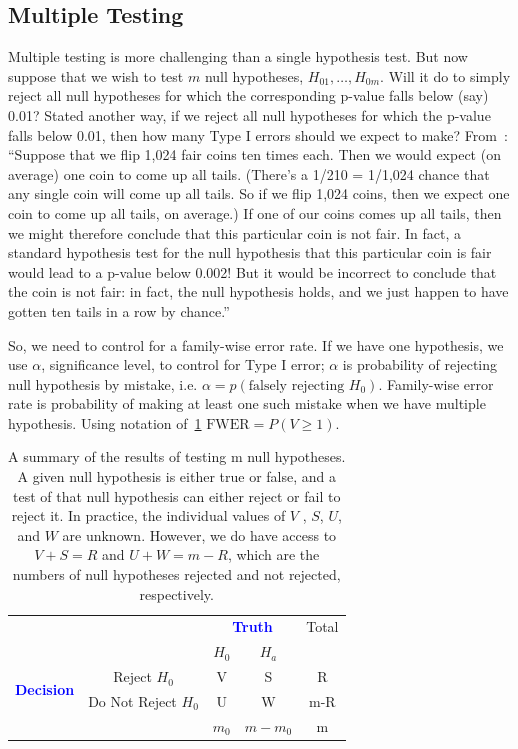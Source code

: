 \subsection{Multiple Testing}
\label{sec:Multiple-Testing}
Multiple testing is more challenging than a single hypothesis test.
But now suppose that we wish to test $m$ null hypotheses,
$H_{01}, \dots, H_{0m}$. 
Will it do to simply reject all null hypotheses for which the
corresponding p-value falls below (say) 0.01? Stated another way, if we
reject all null hypotheses for which the p-value falls below 0.01, then how
many Type I errors should we expect to make?
From~\citep{james2013introduction}:
``Suppose that we flip 1,024 fair
coins ten times each. Then we would expect (on average) one coin to
come up all tails. (There's a 1/210 = 1/1,024 chance that any single coin
will come up all tails. So if we flip 1,024 coins, then we expect one coin to
come up all tails, on average.) If one of our coins comes up all tails, then
we might therefore conclude that this particular coin is not fair. In fact, a
standard hypothesis test for the null hypothesis that this particular coin
is fair would lead to a p-value below 0.002! But it would be incorrect to
conclude that the coin is not fair: in fact, the null hypothesis holds, and we
just happen to have gotten ten tails in a row by chance.''

So, we need to control for a family-wise error rate.
If we have one hypothesis, we use $\alpha$, significance level, to control
for Type I error; $\alpha$ is probability of rejecting null hypothesis by mistake, i.e.
$\alpha = p(\text{falsely rejecting }H_0)$. 
Family-wise error rate is probability of making at least one such mistake when we have multiple hypothesis. Using notation of~\cref{tab:fwer1} $\text{FWER} = P(V \ge 1)$.
\begin{table}[h]
\label{tab:fwer1}
\centering
\begin{tabular}{cc|cc|c}
 &  & \multicolumn{2}{c}{\textcolor{blue}{\textbf{Truth}}}  & Total\\
 &  & $H_0$ & $H_a$ \\
\hline
\multirow{2}{*}{\textcolor{blue}{\textbf{Decision}}}
 & Reject $H_0$ & V & S & R\\
 & Do Not Reject $H_0$ & U & W & m-R \\
 \hline
& & $m_0$ & $m - m_0$ & m
\end{tabular}
\caption{A summary of the results of testing m null hypotheses.
A given null hypothesis is either true or false, and a test of that null hypothesis can either
reject or fail to reject it. 
In practice, the individual values of $V$ , $S$, $U$, and $W$ are unknown. 
However, we do have access to $V + S = R$ and $U+W = m-R$, which are
the numbers of null hypotheses rejected and not rejected, respectively.}
\end{table}

